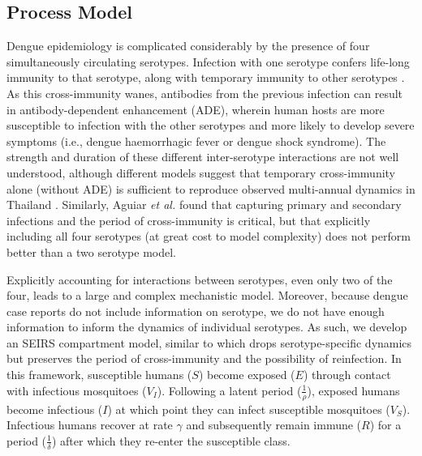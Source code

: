 \documentclass[10pt,letterpaper]{article}
\begin{document}
\subsection*{Process Model}

Dengue epidemiology is complicated considerably by the presence of four simultaneously circulating serotypes.
Infection with one serotype confers life-long immunity to that serotype, along with temporary immunity to other serotypes \cite{Wearing2006}.  
As this cross-immunity wanes, antibodies from the previous infection can result in antibody-dependent enhancement (ADE), wherein human hosts are more susceptible to infection with the other serotypes and more likely to develop severe symptoms (i.e., dengue haemorrhagic fever or dengue shock syndrome)\cite{Wearing2006}.
The strength and duration of these different inter-serotype interactions are not well understood, although different models suggest that temporary cross-immunity alone (without ADE) is sufficient to reproduce observed multi-annual dynamics in Thailand \cite{Wearing2006,Reich2013}.
Similarly, Aguiar \emph{et al.} \cite{Aguiar2013} found that capturing primary and secondary infections and the period of cross-immunity is critical, but that explicitly including all four serotypes (at great cost to model complexity) does not perform better than a two serotype model.

Explicitly accounting for interactions between serotypes, even only two of the four, leads to a large and complex mechanistic model.
Moreover, because dengue case reports do not include information on serotype, we do not have enough information to inform the dynamics of individual serotypes.
As such, we develop an SEIRS compartment model, similar to \cite{Newton1992, Burattini2008, Pinho2010} which drops serotype-specific dynamics but preserves the period of cross-immunity and the possibility of reinfection.
In this framework, susceptible humans ($S$) become exposed ($E$) through contact with infectious mosquitoes ($V_I$).
Following a latent period ($\frac{1}{\rho}$), exposed humans become infectious ($I$) at which point they can infect susceptible mosquitoes ($V_S$).
Infectious humans recover at rate $\gamma$ and subsequently remain immune ($R$) for a period ($\frac{1}{\delta}$) after which they re-enter the susceptible class.
\end{document}
